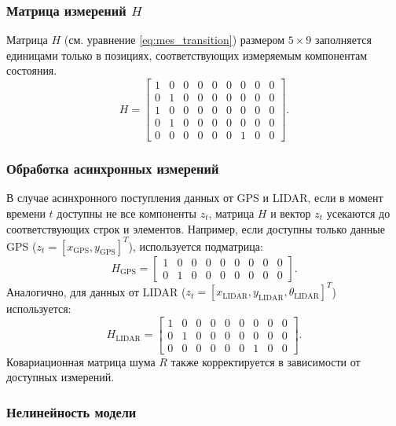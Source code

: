 \subsubsection{Матрица измерений \({H}\)}
\label{subsec:measurement_matrix}

Матрица \({H}\) (см. уравнение \ref{eq:mes_transition}) размером \(5 \times 9\)
заполняется единицами только в позициях, соответствующих измеряемым компонентам состояния.
\begin{equation}
	\label{eq:mes_transition}
	{H} =
	\begin{bmatrix}
	1 & 0 & 0 & 0 & 0 & 0 & 0 & 0 & 0 \\
	0 & 1 & 0 & 0 & 0 & 0 & 0 & 0 & 0 \\
	1 & 0 & 0 & 0 & 0 & 0 & 0 & 0 & 0 \\
	0 & 1 & 0 & 0 & 0 & 0 & 0 & 0 & 0 \\
	0 & 0 & 0 & 0 & 0 & 0 & 1 & 0 & 0
	\end{bmatrix}.
\end{equation}

\subsubsection{Обработка асинхронных измерений}
\label{subsec:async_measurements}

В случае асинхронного поступления данных от GPS и LIDAR, если в момент времени \(t\) доступны 
не все компоненты \({z}_t\), 
матрица \({H}\) и вектор \({z}_t\) усекаются до соответствующих строк и элементов. 
Например, если доступны только данные GPS (\({z}_t = [x_{\text{GPS}}, y_{\text{GPS}}]^T\)), используется подматрица:
\[
{H}_{\text{GPS}} =
\begin{bmatrix}
1 & 0 & 0 & 0 & 0 & 0 & 0 & 0 & 0 \\
0 & 1 & 0 & 0 & 0 & 0 & 0 & 0 & 0
\end{bmatrix}.
\]
Аналогично, для данных от LIDAR (\({z}_t = [x_{\text{LIDAR}}, y_{\text{LIDAR}}, \theta_{\text{LIDAR}}]^T\)) используется:
\[
{H}_{\text{LIDAR}} =
\begin{bmatrix}
1 & 0 & 0 & 0 & 0 & 0 & 0 & 0 & 0 \\
0 & 1 & 0 & 0 & 0 & 0 & 0 & 0 & 0 \\
0 & 0 & 0 & 0 & 0 & 0 & 1 & 0 & 0
\end{bmatrix}.
\]
Ковариационная матрица шума \({R}\) также корректируется в зависимости от доступных измерений.


\subsubsection{Нелинейность модели}
\label{sec:ukf_choice}

